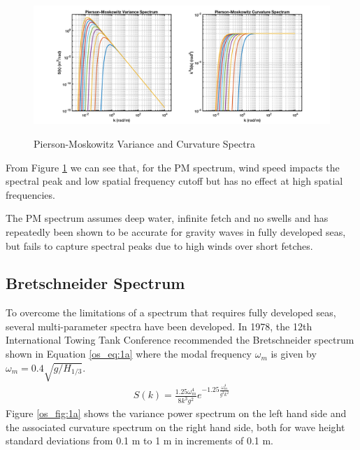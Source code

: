  \begin{figure}[H]
  \begin{center}
\includegraphics[width=6in]{../media/Ocean_Surface/PM_variance_curvature_spectrum.png}
  \end{center}
  \renewcommand{\baselinestretch}{1} \small\normalsize
  \begin{quote}
    \caption[Pierson-Moskowitz Variance and Curvature Spectra]{Pierson-Moskowitz Variance and Curvature Spectra\label{os_fig:1}}
  \end{quote}
\end{figure}
 \renewcommand{\baselinestretch}{2} \small\normalsize
From Figure \ref{os_fig:1} we can see that, for the PM spectrum, wind speed impacts the spectral peak and low spatial frequency cutoff but has no effect at high spatial frequencies.
 
The PM spectrum assumes deep water, infinite fetch and no swells and has repeatedly been shown to be accurate for gravity waves in fully developed seas, but fails to capture spectral peaks due to high winds over short fetches.

\subsection{Bretschneider Spectrum}
To overcome the limitations of a spectrum that requires fully developed seas, several multi-parameter spectra have been developed. In 1978, the 12th International Towing Tank Conference recommended the Bretschneider spectrum \cite{michel_sea_spectra} shown in Equation \ref{os_eq:1a} where the modal frequency $\omega_m$ is given by $\omega_m = 0.4\sqrt{g/H_{1/3}}$.
\begin{equation}
  \begin{gathered}
  \label{os_eq:1a}
  S(k) = \frac{1.25 \omega_m^4}{8k^3g^2}e^{-1.25\frac{\omega_m^4}{g^2k^2}} 
  \end{gathered}
\end{equation}
\renewcommand{\baselinestretch}{2} \small\normalsize
Figure \ref{os_fig:1a} shows the variance power spectrum on the left hand side and the associated curvature spectrum on the right hand side, both for wave height standard deviations from 0.1 m to 1 m in increments of 0.1 m.

